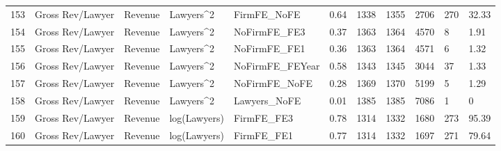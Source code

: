 \begin{table}[ht]
\begin{tabular}{rllllllllll}
  153 & Gross Rev/Lawyer & Revenue & Lawyers^2 & FirmFE\_NoFE & 0.64 & 1338 & 1355 & 2706 & 270 & 32.33 \\ 
  154 & Gross Rev/Lawyer & Revenue & Lawyers^2 & NoFirmFE\_FE3 & 0.37 & 1363 & 1364 & 4570 & 8 & 1.91 \\ 
  155 & Gross Rev/Lawyer & Revenue & Lawyers^2 & NoFirmFE\_FE1 & 0.36 & 1363 & 1364 & 4571 & 6 & 1.32 \\ 
  156 & Gross Rev/Lawyer & Revenue & Lawyers^2 & NoFirmFE\_FEYear & 0.58 & 1343 & 1345 & 3044 & 37 & 1.33 \\ 
  157 & Gross Rev/Lawyer & Revenue & Lawyers^2 & NoFirmFE\_NoFE & 0.28 & 1369 & 1370 & 5199 & 5 & 1.29 \\ 
  158 & Gross Rev/Lawyer & Revenue & Lawyers^2 & Lawyers\_NoFE & 0.01 & 1385 & 1385 & 7086 & 1 & 0 \\ 
  159 & Gross Rev/Lawyer & Revenue & log(Lawyers) & FirmFE\_FE3 & 0.78 & 1314 & 1332 & 1680 & 273 & 95.39 \\ 
  160 & Gross Rev/Lawyer & Revenue & log(Lawyers) & FirmFE\_FE1 & 0.77 & 1314 & 1332 & 1697 & 271 & 79.64 \\ 
   \hline
\end{tabular}
\end{table}
